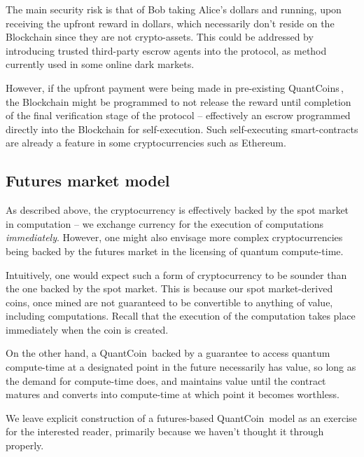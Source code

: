 The main security risk is that of Bob taking Alice's dollars and running, upon receiving the upfront reward in dollars, which necessarily don't reside on the Blockchain since they are not crypto-assets. This could be addressed by introducing trusted third-party escrow agents into the protocol, as method currently used in some online dark markets. 

However, if the upfront payment were being made in pre-existing QuantCoins\texttrademark\,, the Blockchain might be programmed to not release the reward until completion of the final verification stage of the protocol -- effectively an escrow programmed directly into the Blockchain for self-execution. Such self-executing smart-contracts are already a feature in some cryptocurrencies such as Ethereum.

%
%

\subsection{Futures market model}

As described above, the cryptocurrency is effectively backed by the spot market in computation -- we exchange currency for the execution of computations \textit{immediately}. However, one might also envisage more complex cryptocurrencies being backed by the futures market in the licensing of quantum compute-time.

Intuitively, one would expect such a form of cryptocurrency to be sounder than the one backed by the spot market. This is because our spot market-derived coins, once mined are not guaranteed to be convertible to anything of value, including computations. Recall that the execution of the computation takes place immediately when the coin is created.

On the other hand, a QuantCoin\texttrademark\, backed by a guarantee to access quantum compute-time at a designated point in the future necessarily has value, so long as the demand for compute-time does, and maintains value until the contract matures and converts into compute-time at which point it becomes worthless.

We leave explicit construction of a futures-based QuantCoin\texttrademark\, model as an exercise for the interested reader, primarily because we haven't thought it through properly.

%
%

